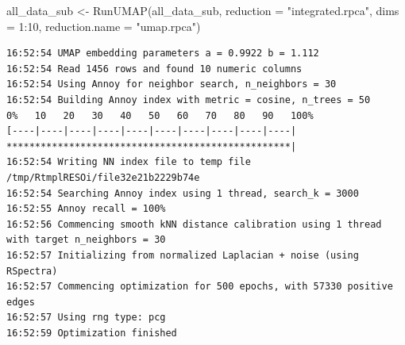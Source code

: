 \documentclass[
  letterpaper,
  DIV=11,
  numbers=noendperiod]{scrreprt}
\newenvironment{Shaded}{\begin{snugshade}}{\end{snugshade}}
\newcommand{\AttributeTok}[1]{\textcolor[rgb]{0.40,0.45,0.13}{#1}}
\newcommand{\DecValTok}[1]{\textcolor[rgb]{0.68,0.00,0.00}{#1}}
\newcommand{\FunctionTok}[1]{\textcolor[rgb]{0.28,0.35,0.67}{#1}}
\newcommand{\NormalTok}[1]{\textcolor[rgb]{0.00,0.23,0.31}{#1}}
\newcommand{\OtherTok}[1]{\textcolor[rgb]{0.00,0.23,0.31}{#1}}
\newcommand{\SpecialCharTok}[1]{\textcolor[rgb]{0.37,0.37,0.37}{#1}}
\newcommand{\StringTok}[1]{\textcolor[rgb]{0.13,0.47,0.30}{#1}}
\begin{document}
\begin{Shaded}
\begin{Highlighting}[]
\NormalTok{all\_data\_sub }\OtherTok{\textless{}{-}} \FunctionTok{RunUMAP}\NormalTok{(all\_data\_sub, }\AttributeTok{reduction =} \StringTok{"integrated.rpca"}\NormalTok{, }\AttributeTok{dims =} \DecValTok{1}\SpecialCharTok{:}\DecValTok{10}\NormalTok{, }\AttributeTok{reduction.name =} \StringTok{"umap.rpca"}\NormalTok{)}
\end{Highlighting}
\end{Shaded}

\begin{verbatim}
16:52:54 UMAP embedding parameters a = 0.9922 b = 1.112
16:52:54 Read 1456 rows and found 10 numeric columns
16:52:54 Using Annoy for neighbor search, n_neighbors = 30
16:52:54 Building Annoy index with metric = cosine, n_trees = 50
0%   10   20   30   40   50   60   70   80   90   100%
[----|----|----|----|----|----|----|----|----|----|
**************************************************|
16:52:54 Writing NN index file to temp file /tmp/RtmplRESOi/file32e21b2229b74e
16:52:54 Searching Annoy index using 1 thread, search_k = 3000
16:52:55 Annoy recall = 100%
16:52:56 Commencing smooth kNN distance calibration using 1 thread with target n_neighbors = 30
16:52:57 Initializing from normalized Laplacian + noise (using RSpectra)
16:52:57 Commencing optimization for 500 epochs, with 57330 positive edges
16:52:57 Using rng type: pcg
16:52:59 Optimization finished
\end{verbatim}
\end{document}
